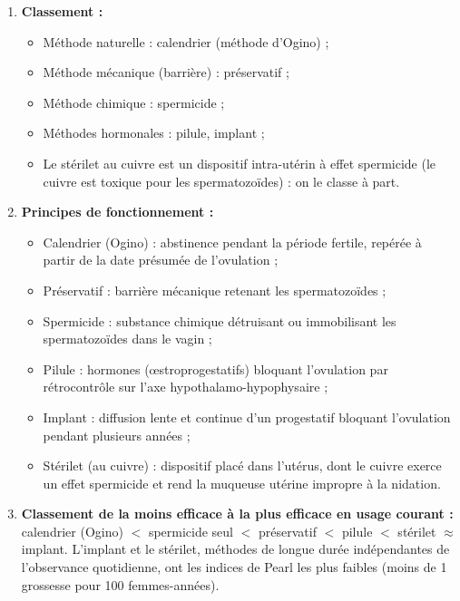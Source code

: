 \documentclass[11pt]{article}
\begin{document}
\begin{corrige}
\begin{enumerate}
\item \textbf{Classement :}
\begin{itemize}
\item Méthode naturelle : calendrier (méthode d'Ogino) ;
\item Méthode mécanique (barrière) : préservatif ;
\item Méthode chimique : spermicide ;
\item Méthodes hormonales : pilule, implant ;
\item Le stérilet au cuivre est un dispositif intra-utérin à effet spermicide (le cuivre est toxique pour les spermatozoïdes) : on le classe à part.
\end{itemize}
\item \textbf{Principes de fonctionnement :}
\begin{itemize}
\item Calendrier (Ogino) : abstinence pendant la période fertile, repérée à partir de la date présumée de l'ovulation ;
\item Préservatif : barrière mécanique retenant les spermatozoïdes ;
\item Spermicide : substance chimique détruisant ou immobilisant les spermatozoïdes dans le vagin ;
\item Pilule : hormones (\oe{}stroprogestatifs) bloquant l'ovulation par rétrocontrôle sur l'axe hypothalamo-hypophysaire ;
\item Implant : diffusion lente et continue d'un progestatif bloquant l'ovulation pendant plusieurs années ;
\item Stérilet (au cuivre) : dispositif placé dans l'utérus, dont le cuivre exerce un effet spermicide et rend la muqueuse utérine impropre à la nidation.
\end{itemize}
\item \textbf{Classement de la moins efficace à la plus efficace en usage courant :} calendrier (Ogino) $<$ spermicide seul $<$ préservatif $<$ pilule $<$ stérilet $\approx$ implant. L'implant et le stérilet, méthodes de longue durée indépendantes de l'observance quotidienne, ont les indices de Pearl les plus faibles (moins de 1 grossesse pour 100 femmes-années).
\end{enumerate}
\end{corrige}
\end{document}
